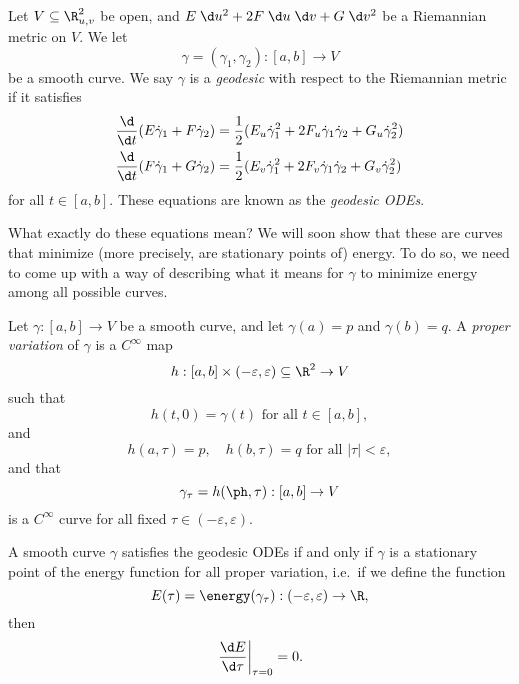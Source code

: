 \documentclass[a4paper]{article}
\begin{document}
\begin{defi}[Geodesic]
  Let $V \subseteq \R_{u, v}^2$ be open, and $E \;\d u^2 + 2F \;\d u\;\d v + G \;\d v^2$ be a Riemannian metric on $V$. We let
  \[
    \gamma = (\gamma_1, \gamma_2): [a, b] \to V
  \]
  be a smooth curve. We say $\gamma$ is a \emph{geodesic} with respect to the Riemannian metric if it satisfies
  \begin{align*}
    \frac{\d}{\d t}(E \dot{\gamma}_1 + F \dot{\gamma}_2) &= \frac{1}{2}(E_u \dot{\gamma}_1^2 + 2 F_u \dot{\gamma}_1\dot{\gamma}_2 + G_u \dot{\gamma}_2^2)\\
    \frac{\d}{\d t}(F \dot{\gamma}_1 + G \dot{\gamma}_2) &= \frac{1}{2}(E_v \dot{\gamma}_1^2 + 2 F_v \dot{\gamma}_1\dot{\gamma}_2 + G_v \dot{\gamma}_2^2)
  \end{align*}
  for all $t \in [a, b]$. These equations are known as the \emph{geodesic ODEs}.
\end{defi}
What exactly do these equations mean? We will soon show that these are curves that minimize (more precisely, are stationary points of) energy. To do so, we need to come up with a way of describing what it means for $\gamma$ to minimize energy among all possible curves.

\begin{defi}
  Let $\gamma: [a, b] \to V$ be a smooth curve, and let $\gamma(a) = p$ and $\gamma(b) = q$. A \emph{proper variation} of $\gamma$ is a $C^\infty$ map
  \[
    h: [a, b] \times (-\varepsilon, \varepsilon) \subseteq \R^2 \to V
  \]
  such that
  \[
    h(t, 0) = \gamma(t)\text{ for all }t \in [a, b],
  \]
  and
  \[
    h(a, \tau) = p,\quad h(b, \tau) = q\text{ for all }|\tau| < \varepsilon,
  \]
  and that
  \[
    \gamma_\tau = h(\ph, \tau): [a, b] \to V
  \]
  is a $C^\infty$ curve for all fixed $\tau \in (-\varepsilon, \varepsilon)$.
\end{defi}

\begin{prop}
  A smooth curve $\gamma$ satisfies the geodesic ODEs if and only if $\gamma$ is a stationary point of the energy function for all proper variation, i.e.\ if we define the function
  \[
    E(\tau) = \energy(\gamma_\tau): (-\varepsilon, \varepsilon) \to \R,
  \]
  then
  \[
    \left.\frac{\d E}{\d \tau} \right|_{\tau = 0} = 0.
  \]
\end{prop}
\end{document}

